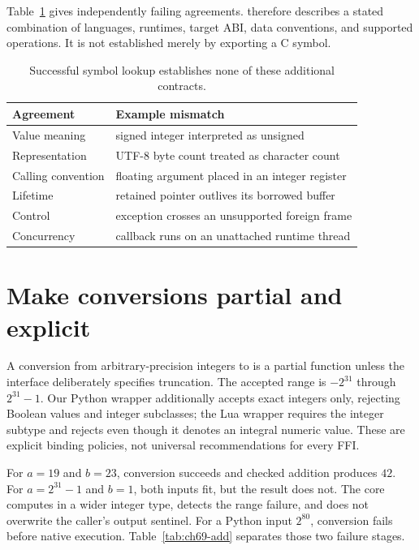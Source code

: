 Table~\ref{tab:ch69-agreement} gives independently failing agreements.
 therefore describes a stated combination of languages, runtimes, target ABI, data conventions, and supported operations.
It is not established merely by exporting a C symbol.

\begin{table}[htbp]
\caption{Successful symbol lookup establishes none of these additional contracts.}
\label{tab:ch69-agreement}
\centering
\begin{tabular}{ll}
\toprule
Agreement & Example mismatch \\
\midrule
Value meaning & signed integer interpreted as unsigned \\
Representation & UTF-8 byte count treated as character count \\
Calling convention & floating argument placed in an integer register \\
Lifetime & retained pointer outlives its borrowed buffer \\
Control & exception crosses an unsupported foreign frame \\
Concurrency & callback runs on an unattached runtime thread \\
\bottomrule
\end{tabular}
\end{table}

\section{Make conversions partial and explicit}
\label{sec:ch69-conversion}
A conversion from arbitrary-precision integers to  is a partial function unless the interface deliberately specifies truncation.
The accepted range is $-2^{31}$ through $2^{31}-1$.
Our Python wrapper additionally accepts exact integers only, rejecting Boolean values and integer subclasses; the Lua wrapper requires the integer subtype and rejects  even though it denotes an integral numeric value.
These are explicit binding policies, not universal recommendations for every FFI.

For $a=19$ and $b=23$, conversion succeeds and checked addition produces $42$.
For $a=2^{31}-1$ and $b=1$, both inputs fit, but the result does not.
The core computes in a wider integer type, detects the range failure, and does not overwrite the caller's output sentinel.
For a Python input $2^{80}$, conversion fails before native execution.
Table~\ref{tab:ch69-add} separates those two failure stages.

